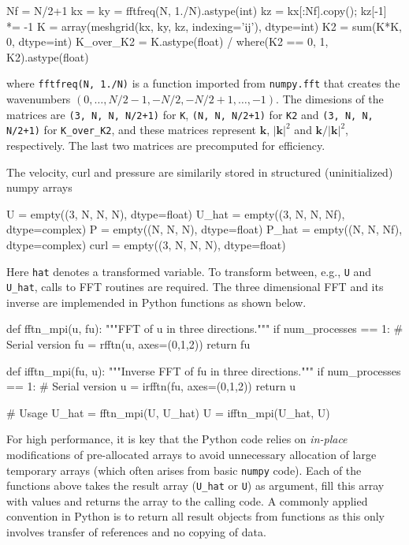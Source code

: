 \documentclass[11pt, oneside]{article}
\newcommand{\inpyth}{\lstinline[style=pythonstyle, basicstyle=\ttfamily]} %[]%
\begin{document}
\begin{python}
Nf = N/2+1
kx = ky = fftfreq(N, 1./N).astype(int)
kz = kx[:Nf].copy(); kz[-1] *= -1
K = array(meshgrid(kx, ky, kz, indexing='ij'), dtype=int)
K2 = sum(K*K, 0, dtype=int)
K_over_K2 = K.astype(float) / where(K2 == 0, 1, K2).astype(float)
\end{python}
where \inpyth{fftfreq(N, 1./N)} is a function imported from \inpyth{numpy.fft} that creates the wavenumbers $(0, \ldots, N/2-1, -N/2, -N/2+1, \ldots, -1)$. The dimesions of the matrices are \inpyth{(3, N, N, N/2+1)} for \texttt{K}, \inpyth{(N, N, N/2+1)} for \texttt{K2} and \inpyth{(3, N, N, N/2+1)} for \texttt{K\_over\_K2}, and these matrices represent $\bm{k}$, $|\bm{k}|^2$ and $\bm{k}/|\bm{k}|^2$, respectively. The last two matrices are precomputed for efficiency.

The velocity, curl and pressure are similarily stored in structured (uninitialized) numpy arrays

\begin{python}
U     = empty((3, N, N, N),  dtype=float)
U_hat = empty((3, N, N, Nf), dtype=complex)
P     = empty((N, N, N),     dtype=float)
P_hat = empty((N, N, Nf),    dtype=complex)
curl  = empty((3, N, N, N),  dtype=float)
\end{python}
Here \inpyth{hat} denotes a transformed variable. To transform between, e.g., \inpyth{U} and \inpyth{U_hat}, calls to FFT routines are required. The three dimensional FFT and its inverse are implemended in Python functions as shown below.

\begin{python}
def fftn_mpi(u, fu):
    """FFT of u in three directions."""
    if num_processes == 1:                # Serial version
        fu = rfftn(u, axes=(0,1,2))
    return fu

def ifftn_mpi(fu, u):
    """Inverse FFT of fu in three directions."""
    if num_processes == 1:                # Serial version
        u = irfftn(fu, axes=(0,1,2))
    return u

# Usage
U_hat = fftn_mpi(U, U_hat)
U = ifftn_mpi(U_hat, U)
\end{python}
For high performance, it is key that the Python code relies on \emph{in-place}
modifications of pre-allocated arrays to avoid unnecessary allocation of
large temporary arrays (which often arises from basic \texttt{numpy} code).
Each of the functions above takes the result array (\texttt{U\_hat} or
\texttt{U}) as argument, fill this array with values and returns the
array to the calling code. A commonly applied convention in
Python is to return all result objects from functions as this only involves
transfer of references and no copying of data.
\end{document}
